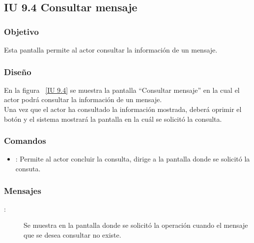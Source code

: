 \newpage 
\subsection{IU 9.4 Consultar mensaje}

\subsubsection{Objetivo}
	
	Esta pantalla permite al actor consultar la información de un mensaje.
	
\subsubsection{Diseño}

    En la figura ~\ref{IU 9.4} se muestra la pantalla ``Consultar mensaje'' en la cual el actor podrá consultar la información de un mensaje.\\
	
	Una vez que el actor ha consultado la información mostrada, deberá oprimir el botón  y el sistema mostrará la pantalla en la cuál se solicitó la consulta.


\subsubsection{Comandos}
\begin{itemize}
	\item {}: Permite al actor concluir la consulta, dirige a la pantalla donde se solicitó la consuta.
\end{itemize}

\subsubsection{Mensajes}
	
\begin{description}
	\item[:] Se muestra en la pantalla donde se solicitó la operación cuando el mensaje que se desea consultar no existe.
\end{description}
